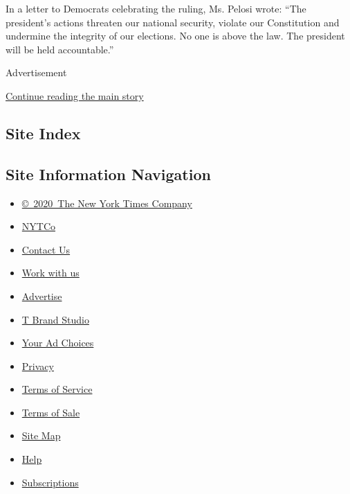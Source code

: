 In a letter to Democrats celebrating the ruling, Ms. Pelosi wrote: ``The
president's actions threaten our national security, violate our
Constitution and undermine the integrity of our elections. No one is
above the law. The president will be held accountable.''

Advertisement

\protect\hyperlink{after-bottom}{Continue reading the main story}

\hypertarget{site-index}{%
\subsection{Site Index}\label{site-index}}

\hypertarget{site-information-navigation}{%
\subsection{Site Information
Navigation}\label{site-information-navigation}}

\begin{itemize}
\tightlist
\item
  \href{https://help.nytimes3xbfgragh.onion/hc/en-us/articles/115014792127-Copyright-notice}{©~2020~The
  New York Times Company}
\end{itemize}

\begin{itemize}
\tightlist
\item
  \href{https://www.nytco.com/}{NYTCo}
\item
  \href{https://help.nytimes3xbfgragh.onion/hc/en-us/articles/115015385887-Contact-Us}{Contact
  Us}
\item
  \href{https://www.nytco.com/careers/}{Work with us}
\item
  \href{https://nytmediakit.com/}{Advertise}
\item
  \href{http://www.tbrandstudio.com/}{T Brand Studio}
\item
  \href{https://www.nytimes3xbfgragh.onion/privacy/cookie-policy\#how-do-i-manage-trackers}{Your
  Ad Choices}
\item
  \href{https://www.nytimes3xbfgragh.onion/privacy}{Privacy}
\item
  \href{https://help.nytimes3xbfgragh.onion/hc/en-us/articles/115014893428-Terms-of-service}{Terms
  of Service}
\item
  \href{https://help.nytimes3xbfgragh.onion/hc/en-us/articles/115014893968-Terms-of-sale}{Terms
  of Sale}
\item
  \href{https://spiderbites.nytimes3xbfgragh.onion}{Site Map}
\item
  \href{https://help.nytimes3xbfgragh.onion/hc/en-us}{Help}
\item
  \href{https://www.nytimes3xbfgragh.onion/subscription?campaignId=37WXW}{Subscriptions}
\end{itemize}
